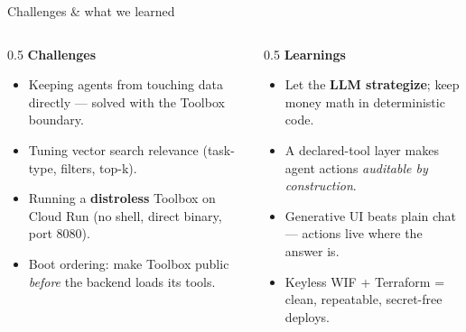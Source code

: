 \documentclass[aspectratio=169,11pt]{beamer}
\begin{document}
\begin{frame}{Challenges \& what we learned}
\begin{columns}[T]
\begin{column}{0.5\textwidth}
\textbf{\color{macyred}Challenges}
\begin{itemize}
  \item Keeping agents from touching data directly --- solved with the Toolbox boundary.
  \item Tuning vector search relevance (task-type, filters, top-k).
  \item Running a \textbf{distroless} Toolbox on Cloud Run (no shell, direct binary, port 8080).
  \item Boot ordering: make Toolbox public \emph{before} the backend loads its tools.
\end{itemize}
\end{column}
\begin{column}{0.5\textwidth}
\textbf{\color{macyred}Learnings}
\begin{itemize}
  \item Let the \textbf{LLM strategize}; keep money math in deterministic code.
  \item A declared-tool layer makes agent actions \emph{auditable by construction}.
  \item Generative UI beats plain chat --- actions live where the answer is.
  \item Keyless WIF + Terraform = clean, repeatable, secret-free deploys.
\end{itemize}
\end{column}
\end{columns}
\end{frame}
\end{document}
